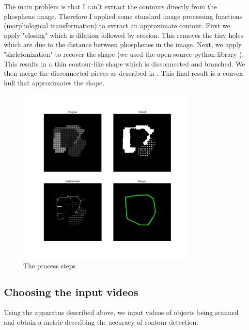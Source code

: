 \documentclass[]{article}
\begin{document}
The main problem is that I can't  extract the contours directly from the phosphene image. Therefore I applied some standard image processing functions (morphological transformation) to extract an approximate contour.
First we apply "closing" which is dilation followed by erosion. This removes the tiny holes which are due to the distance between phosphenes in the image. Next, we apply "skeletonization" to recover the shape (we used the open source python library \cite{scikit-image}). This results in a thin contour-like shape which is disconnected and branched. We then merge the disconnected pieces as described in \cite{stackoverflow}. This final result is a convex hull that approximates the shape.


\begin{figure}[h] %
	\centering
	\includegraphics[width=0.8\textwidth]{compare_pipeline.png}
	\caption{The process steps}
	\label{fig:example_image}
\end{figure}

\subsection{Choosing the input videos}
Using the apparatus described above, we input videos of objects being scanned and obtain a metric describing the accuracy of contour detection. \\
\end{document}
